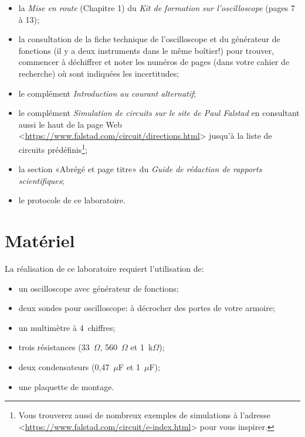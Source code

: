 \documentclass[canadien,12pt,oneside,letterpaper]{article}
\begin{document}
\begin{itemize} \itemsep4pt
\item la \textit{Mise en route} (Chapitre 1) du \textit{Kit de formation sur l'oscilloscope} (pages 7 à 13);
\item la consultation de la fiche technique de l'oscilloscope et du générateur de fonctions (il y a deux instruments dans le même boîtier!) pour trouver, commencer à déchiffrer et noter les numéros de pages (dans votre cahier de recherche) où sont indiquées les incertitudes;
\item le complément \textit{Introduction au courant alternatif};
\item le complément \textit{Simulation de circuits sur le site de Paul Falstad} en consultant aussi le haut de la page Web <\url{https://www.falstad.com/circuit/directions.html}> jusqu'à la liste de circuits prédéfinis\footnote{Vous trouverez aussi de nombreux exemples de simulations à l'adresse <\url{https://www.falstad.com/circuit/e-index.html}> pour vous inspirer.};
\item la section «Abrégé et page titre» du \textit{Guide de rédaction de rapports scientifiques};
\item le protocole de ce laboratoire.
\end{itemize}
\vspace{1ex}
\noindent{}

\section{Matériel}

\noindent La réalisation de ce laboratoire requiert l'utilisation de:
\vspace{1ex}
\begin{itemize} \itemsep4pt
\item un oscilloscope avec générateur de fonctions;
\item deux sondes pour oscilloscope: à décrocher des portes de votre armoire;
\item un multimètre à 4\textonehalf~chiffres;
\item trois résistances (33~$\Omega$, 560~$\Omega$ et 1~k$\Omega$);
\item deux condensateurs (0,47~$\mu$F et 1~$\mu$F);
\item une plaquette de montage.
\end{itemize}
\end{document}
